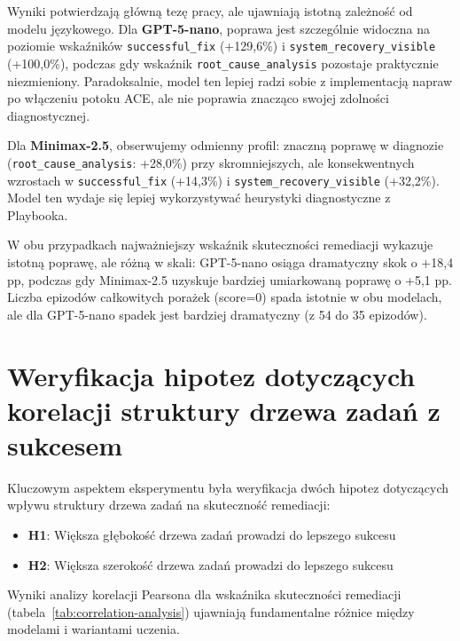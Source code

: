 Wyniki potwierdzają główną tezę pracy, ale ujawniają istotną zależność od modelu językowego. Dla \textbf{GPT-5-nano}, poprawa jest szczególnie widoczna na poziomie wskaźników \texttt{successful\_fix} (+129,6\%) i \texttt{system\_recovery\_visible} (+100,0\%), podczas gdy wskaźnik \texttt{root\_cause\_analysis} pozostaje praktycznie niezmieniony. Paradoksalnie, model ten lepiej radzi sobie z implementacją napraw po włączeniu potoku ACE, ale nie poprawia znacząco swojej zdolności diagnostycznej.

Dla \textbf{Minimax-2.5}, obserwujemy odmienny profil: znaczną poprawę w diagnozie (\texttt{root\_cause\_analysis}: +28,0\%) przy skromniejszych, ale konsekwentnych wzrostach w \texttt{successful\_fix} (+14,3\%) i \texttt{system\_recovery\_visible} (+32,2\%). Model ten wydaje się lepiej wykorzystywać heurystyki diagnostyczne z Playbooka.

W obu przypadkach najważniejszy wskaźnik skuteczności remediacji wykazuje istotną poprawę, ale różną w skali: GPT-5-nano osiąga dramatyczny skok o +18,4 pp, podczas gdy Minimax-2.5 uzyskuje bardziej umiarkowaną poprawę o +5,1 pp. Liczba epizodów całkowitych porażek (score=0) spada istotnie w obu modelach, ale dla GPT-5-nano spadek jest bardziej dramatyczny (z 54 do 35 epizodów).

\section{Weryfikacja hipotez dotyczących korelacji struktury drzewa zadań z sukcesem}

Kluczowym aspektem eksperymentu była weryfikacja dwóch hipotez dotyczących wpływu struktury drzewa zadań na skuteczność remediacji:
\begin{itemize}
    \item \textbf{H1}: Większa głębokość drzewa zadań prowadzi do lepszego sukcesu
    \item \textbf{H2}: Większa szerokość drzewa zadań prowadzi do lepszego sukcesu  
\end{itemize}

Wyniki analizy korelacji Pearsona dla wskaźnika skuteczności remediacji (tabela~\ref{tab:correlation-analysis}) ujawniają fundamentalne różnice między modelami i wariantami uczenia.

